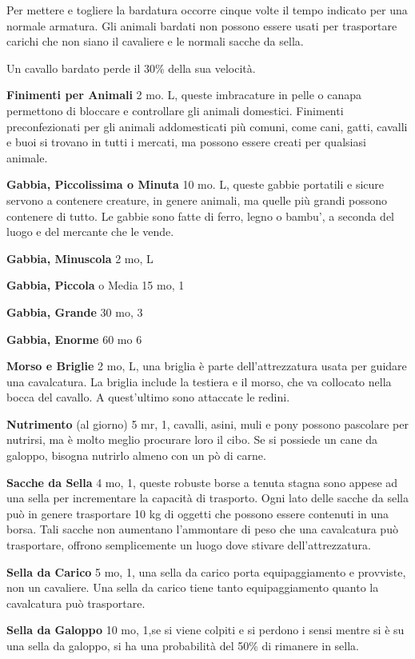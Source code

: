 \documentclass[a4paper,11pt,twoside,openany]{book}
\begin{document}
{Per mettere e togliere la bardatura occorre cinque volte il tempo indicato per una normale armatura. Gli animali bardati non possono essere usati per trasportare carichi che non siano il cavaliere e le normali sacche da sella.

Un cavallo bardato perde il 30\% della sua velocità.

\textbf{Finimenti per Animali} 2 mo. L, queste imbracature in pelle o canapa permettono di bloccare e controllare gli animali domestici. Finimenti preconfezionati per gli animali addomesticati più comuni, come cani, gatti, cavalli e buoi si trovano in tutti i mercati, ma possono essere creati per qualsiasi animale.

\textbf{Gabbia, Piccolissima o Minuta} 10 mo. L, queste gabbie portatili e sicure servono a contenere creature, in genere animali, ma quelle più grandi possono contenere di tutto. Le gabbie sono fatte di ferro, legno o bambu', a seconda del luogo e del mercante che le vende. 

\textbf{Gabbia, Minuscola} 2 mo, L

\textbf{Gabbia, Piccola} o Media 15 mo, 1

\textbf{Gabbia, Grande} 30 mo, 3

\textbf{Gabbia, Enorme} 60 mo 6

\textbf{Morso e Briglie} 2 mo, L, una briglia è parte dell'attrezzatura usata per guidare una cavalcatura. La briglia include la testiera e il morso, che va collocato nella bocca del cavallo. A quest'ultimo sono attaccate le redini.

\textbf{Nutrimento} (al giorno) 5 mr,  1, cavalli, asini, muli e pony possono pascolare per nutrirsi, ma è molto meglio procurare loro il cibo. Se si possiede un cane da galoppo, bisogna nutrirlo almeno con un pò di carne.

\textbf{Sacche da Sella} 4 mo, 1, queste robuste borse a tenuta stagna sono appese ad una sella per incrementare la capacità di trasporto.
Ogni lato delle sacche da sella può in genere trasportare 10 kg di oggetti che possono essere contenuti in una borsa.
Tali sacche non aumentano l'ammontare di peso che una cavalcatura può trasportare, offrono semplicemente un luogo dove stivare dell'attrezzatura.

\textbf{Sella da Carico} 5 mo, 1, una sella da carico porta equipaggiamento e provviste, non un cavaliere. Una sella da carico tiene tanto equipaggiamento quanto la cavalcatura può trasportare.

\textbf{Sella da Galoppo} 10 mo, 1,se si viene colpiti e si perdono i sensi mentre si è su una sella da galoppo, si ha una probabilità del 50\% di rimanere in sella.

}
\end{document}
